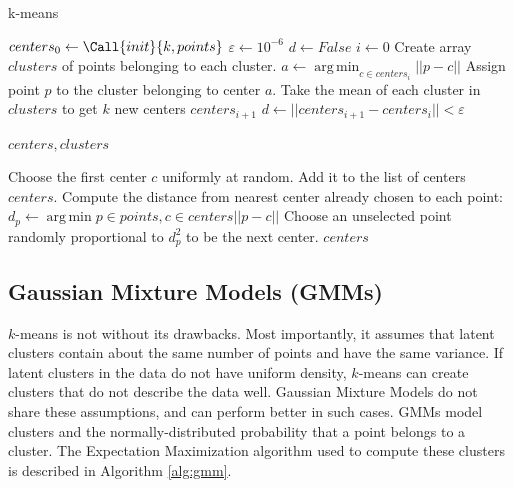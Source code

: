 \documentclass[11pt]{amsart}
\DeclareMathOperator*{\argmin}{arg\,min}
\begin{document}
\begin{algorithm}[!ht]
\caption{k-means}\label{alg:k-means}
\begin{algorithmic}
    \State \(centers_0 \gets \Call{init}{k, points}\)
    \State \(\varepsilon \gets 10^{-6}\) 
    \State \(d \gets False\) 
    \State \(i \gets 0\) 
        \State Create array \(clusters\) of points belonging to each cluster.
            \State \(a \gets \argmin_{c \in centers_i} ||p - c||\) 
            \State Assign point \(p\) to the cluster belonging to center \(a\).
        \EndFor
        \State Take the mean of each cluster in \(clusters\) to get \(k\) new centers \(centers_{i+1}\)
        \State \(d \gets ||centers_{i+1} - centers_{i}|| < \varepsilon\)
        
    \EndWhile
    \Return \(centers, clusters\)
    \EndProcedure

        \State {}
        \State Choose the first center \(c\) uniformly at random. Add it to the list of centers \(centers\).
        \State Compute the distance from nearest center already chosen to each point:
        \Statex \(d_p \gets \argmin{p\in points, c\in centers}||p - c||\)
        \State Choose an unselected point randomly proportional to \(d_p^2\) to be the next center.
        \EndWhile
        \Return \(centers\)
    \EndProcedure
\end{algorithmic}
\end{algorithm}

\subsection*{Gaussian Mixture Models (GMMs)} \label{sec:gmms}

\(k\)-means is not without its drawbacks. Most importantly, it assumes that
latent clusters contain about the same number of points and have the same
variance. If latent clusters in the data do not have uniform density,
\(k\)-means can create clusters that do not describe the data well. Gaussian
Mixture Models do not share these assumptions, and can perform better in such
cases. GMMs model clusters and the normally-distributed probability that a point
belongs to a cluster. The Expectation Maximization algorithm used to compute
these clusters is described in Algorithm \ref{alg:gmm}.
\end{document}
